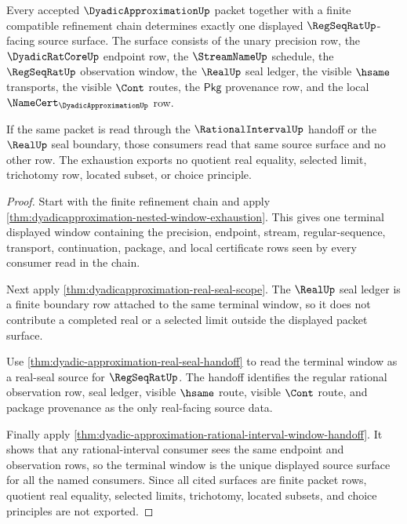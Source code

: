 \begin{theorem}
\label{thm:dyadicapproximation-window-regseqrat-source-exhaustion}
Every accepted $\DyadicApproximationUp$ packet together with a finite
compatible refinement chain determines exactly one displayed
$\RegSeqRatUp$-facing source surface. The surface consists of the unary
precision row, the $\DyadicRatCoreUp$ endpoint row, the $\StreamNameUp$
schedule, the $\RegSeqRatUp$ observation window, the $\RealUp$ seal ledger,
the visible $\hsame$ transports, the visible $\Cont$ routes, the
$\mathsf{Pkg}$ provenance row, and the local
$\NameCert_{\DyadicApproximationUp}$ row.

If the same packet is read through the $\RationalIntervalUp$ handoff or the
$\RealUp$ seal boundary, those consumers read that same source surface and no
other row. The exhaustion exports no quotient real equality, selected limit,
trichotomy row, located subset, or choice principle.
\end{theorem}
\begin{proof}
Start with the finite refinement chain and apply
\autoref{thm:dyadicapproximation-nested-window-exhaustion}. This gives one
terminal displayed window containing the precision, endpoint, stream,
regular-sequence, transport, continuation, package, and local certificate rows
seen by every consumer read in the chain.

Next apply \autoref{thm:dyadicapproximation-real-seal-scope}. The
$\RealUp$ seal ledger is a finite boundary row attached to the same terminal
window, so it does not contribute a completed real or a selected limit outside
the displayed packet surface.

Use \autoref{thm:dyadic-approximation-real-seal-handoff} to read the terminal
window as a real-seal source for $\RegSeqRatUp$. The handoff identifies the
regular rational observation row, seal ledger, visible $\hsame$ route, visible
$\Cont$ route, and package provenance as the only real-facing source data.

Finally apply
\autoref{thm:dyadic-approximation-rational-interval-window-handoff}. It shows
that any rational-interval consumer sees the same endpoint and observation
rows, so the terminal window is the unique displayed source surface for all
the named consumers. Since all cited surfaces are finite packet rows, quotient
real equality, selected limits, trichotomy, located subsets, and choice
principles are not exported.
\end{proof}

